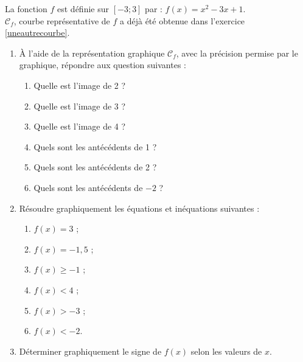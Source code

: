\begin{exo}
La fonction $f$ est d\'efinie sur $[-3;3]$ par : $f(x)=x^2-3x+1$.\\
$\mathcal{C}_f$, courbe repr\'esentative de $f$ a d\'ej\`a \'et\'e obtenue dans l'exercice \ref{uneautrecourbe}.
\begin{enumerate}
	\item \`A l'aide de la repr\'esentation graphique $\mathcal{C}_f$, avec la pr\'ecision permise par le graphique, r\'epondre aux question suivantes :
		\vspace{-1em}\begin{multicols}{2}
		  \begin{enumerate}
			\item Quelle est l'image de 2 ?
			\item Quelle est l'image de 3 ?
			\item Quelle est l'image de 4 ?
			\item Quels sont les ant\'ec\'edents de 1 ?
			\item Quels sont les ant\'ec\'edents de 2 ?
			\item Quels sont les ant\'ec\'edents de $-2$ ?
		\end{enumerate}
		\end{multicols}\vspace{-1em}
	\item R\'esoudre graphiquement les \'equations et in\'equations suivantes :
\vspace{-1em}\begin{multicols}{3}\begin{enumerate}
	\item $f(x)=3$ ;
	\item $f(x)=-1,5$ ;
	\item $f(x)\geqslant -1$ ;
	\item $f(x)<4$ ;
	\item $f(x)>-3$ ;
	\item $f(x)<-2$.
\end{enumerate}\end{multicols}\vspace{-1em}
\item D\'eterminer graphiquement le signe de $f(x)$ selon les valeurs de $x$.
\end{enumerate}
\end{exo}


